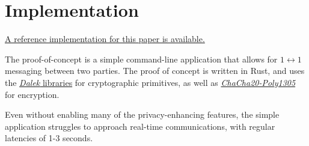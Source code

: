 \chapter{Implementation}\label{Implementation}

\href{https://github.com/encody/near-private-data}{A reference implementation for this paper is available.}

The proof-of-concept is a simple command-line application that allows for $1 \leftrightarrow 1$ messaging between two parties. The proof of concept is written in Rust, and uses the \href{https://github.com/dalek-cryptography}{\emph{Dalek} libraries} for cryptographic primitives, as well as \href{https://github.com/RustCrypto/AEADs/tree/master/chacha20poly1305}{\emph{ChaCha20-Poly1305}} for encryption.

Even without enabling many of the privacy-enhancing features, the simple application struggles to approach real-time communications, with regular
latencies of 1-3 seconds.
